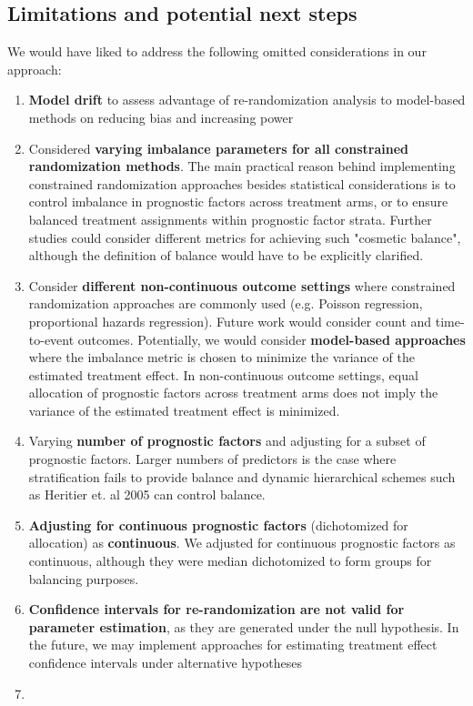 \subsection{Limitations and potential next steps}
We would have liked to address the following omitted considerations in our approach:
\begin{enumerate}
	\item \textbf{Model drift} to assess advantage of re-randomization analysis to model-based methods on reducing bias and increasing power
	\item Considered \textbf{varying imbalance parameters for all constrained randomization methods}. 
	The main practical reason behind implementing constrained randomization approaches besides statistical considerations is to control imbalance in prognostic factors across treatment arms, or to ensure balanced treatment assignments within prognostic factor strata.  
	Further studies could consider different metrics for achieving such "cosmetic balance", although the definition of balance would have to be explicitly clarified. 
	\item Consider \textbf{different non-continuous outcome settings} where constrained randomization approaches are commonly used (e.g. Poisson regression, proportional hazards regression). Future work would consider count and time-to-event outcomes.  Potentially, we would consider \textbf{model-based approaches} where the imbalance metric is chosen to minimize the variance of the estimated treatment effect.  In non-continuous outcome settings, equal allocation of prognostic factors across treatment arms does not imply the variance of the estimated treatment effect is minimized.
	\item Varying \textbf{number of prognostic factors} and adjusting for a subset of prognostic factors.  Larger numbers of predictors is the case where stratification fails to provide balance and dynamic hierarchical schemes such as Heritier et. al 2005 can control balance.
	\item \textbf{Adjusting for continuous prognostic factors} (dichotomized for allocation) as \textbf{continuous}.  We adjusted for continuous prognostic factors as continuous, although they were median dichotomized to form groups for balancing purposes. 
	\item \textbf{Confidence intervals for re-randomization are not valid for parameter estimation}, as they are generated under the null hypothesis.  In the future, we may implement approaches for estimating treatment effect confidence intervals under alternative hypotheses %
	\item 
\end{enumerate}

